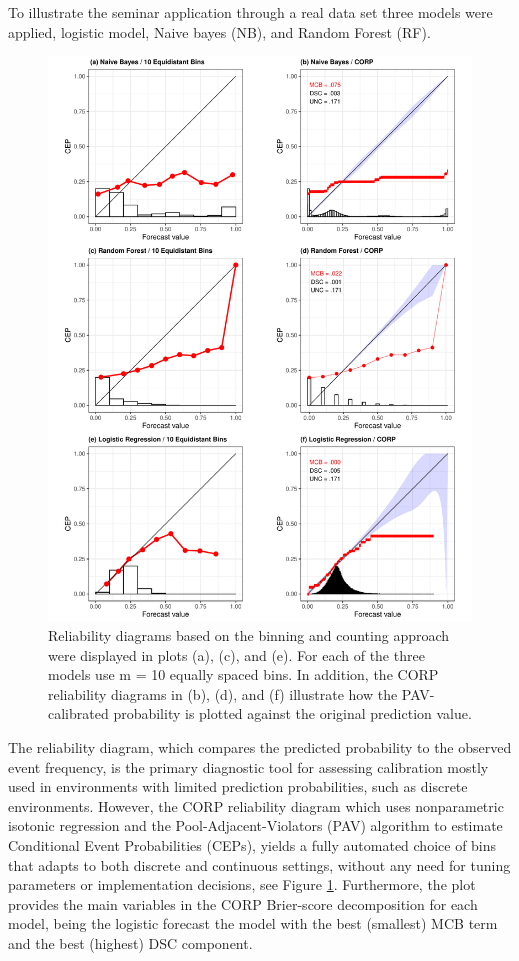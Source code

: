 \documentclass[a4paper,12pt]{article}
\numberwithin{equation}{section}
\begin{document}
   To illustrate the seminar application through a real data set three models were applied, logistic model, Naive bayes (NB), and Random Forest (RF).

   \begin{figure}[hbt!]
      \centering
      \includegraphics[scale=0.7]{Plots_app/layout3.pdf}
      \caption{Reliability diagrams based on the binning and counting approach were displayed in plots (a), (c), and (e). For each of the three models use m = 10 equally spaced bins. In addition, the CORP reliability diagrams in (b), (d), and (f) illustrate how the PAV-calibrated probability is plotted against the original prediction value.}
      \label{fig:rel_corp}
  \end{figure}

  \newpage
   The reliability diagram, which compares the predicted probability to the observed event frequency, is the primary diagnostic tool for assessing calibration mostly used in environments with limited prediction probabilities, such as discrete environments. However, the CORP reliability diagram which uses nonparametric isotonic regression and the Pool-Adjacent-Violators (PAV) algorithm to estimate Conditional Event Probabilities (CEPs), yields a fully automated choice of bins that adapts to both discrete and continuous settings, without any need for tuning parameters or implementation decisions, see Figure \ref{fig:rel_corp}. Furthermore, the plot provides the main variables in the CORP Brier-score decomposition for each model, being the logistic forecast the model with the best (smallest) MCB term and the best (highest) DSC component.\bigskip 
\end{document}
